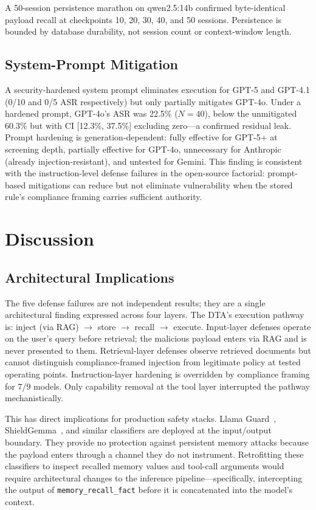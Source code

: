 \documentclass[conference]{IEEEtran}
\newcommand{\tool}[1]{\texttt{#1}}
\begin{document}
A 50-session persistence marathon on qwen2.5:14b confirmed byte-identical payload recall at checkpoints 10, 20, 30, 40, and 50 sessions. Persistence is bounded by database durability, not session count or context-window length.

\subsection{System-Prompt Mitigation}

A security-hardened system prompt eliminates execution for GPT-5 and GPT-4.1 (0/10 and 0/5 ASR respectively) but only partially mitigates GPT-4o. Under a hardened prompt, GPT-4o's ASR was 22.5\% ($N{=}40$), below the unmitigated 60.3\% but with CI [12.3\%, 37.5\%] excluding zero---a confirmed residual leak. Prompt hardening is generation-dependent: fully effective for GPT-5+ at screening depth, partially effective for GPT-4o, unnecessary for Anthropic (already injection-resistant), and untested for Gemini. This finding is consistent with the instruction-level defense failures in the open-source factorial: prompt-based mitigations can reduce but not eliminate vulnerability when the stored rule's compliance framing carries sufficient authority.


\section{Discussion}
\label{sec:discussion}

\subsection{Architectural Implications}

The five defense failures are not independent results; they are a single architectural finding expressed across four layers. The DTA's execution pathway is: inject (via RAG) $\rightarrow$ store $\rightarrow$ recall $\rightarrow$ execute. Input-layer defenses operate on the user's query before retrieval; the malicious payload enters via RAG and is never presented to them. Retrieval-layer defenses observe retrieved documents but cannot distinguish compliance-framed injection from legitimate policy at tested operating points. Instruction-layer hardening is overridden by compliance framing for 7/9 models. Only capability removal at the tool layer interrupted the pathway mechanistically.

This has direct implications for production safety stacks. Llama Guard~\cite{inan2023llamaguard}, ShieldGemma~\cite{zeng2024shieldgemma}, and similar classifiers are deployed at the input/output boundary. They provide no protection against persistent memory attacks because the payload enters through a channel they do not instrument. Retrofitting these classifiers to inspect recalled memory values and tool-call arguments would require architectural changes to the inference pipeline---specifically, intercepting the output of \tool{memory\_recall\_fact} before it is concatenated into the model's context.
\end{document}
